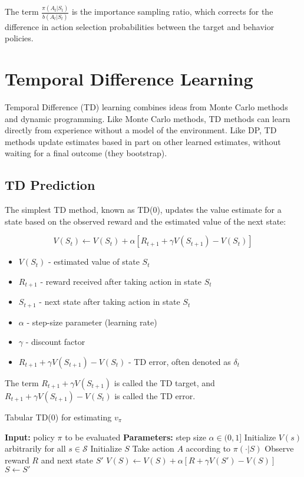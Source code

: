 \documentclass[11pt,a4paper]{article}
\begin{document}
The term $\frac{\pi(A_t|S_t)}{b(A_t|S_t)}$ is the importance sampling ratio, which corrects for the difference in action selection probabilities between the target and behavior policies.

\section{Temporal Difference Learning}

Temporal Difference (TD) learning combines ideas from Monte Carlo methods and dynamic programming. Like Monte Carlo methods, TD methods can learn directly from experience without a model of the environment. Like DP, TD methods update estimates based in part on other learned estimates, without waiting for a final outcome (they bootstrap).

\subsection{TD Prediction}

The simplest TD method, known as TD(0), updates the value estimate for a state based on the observed reward and the estimated value of the next state:

\begin{equation}
V(S_t) \leftarrow V(S_t) + \alpha [R_{t+1} + \gamma V(S_{t+1}) - V(S_t)]
\end{equation}

\begin{tcolorbox}[title=Notation Overview]
\begin{itemize}
    \item $V(S_t)$ - estimated value of state $S_t$
    \item $R_{t+1}$ - reward received after taking action in state $S_t$
    \item $S_{t+1}$ - next state after taking action in state $S_t$
    \item $\alpha$ - step-size parameter (learning rate)
    \item $\gamma$ - discount factor
    \item $R_{t+1} + \gamma V(S_{t+1}) - V(S_t)$ - TD error, often denoted as $\delta_t$
\end{itemize}
\end{tcolorbox}

The term $R_{t+1} + \gamma V(S_{t+1})$ is called the TD target, and $R_{t+1} + \gamma V(S_{t+1}) - V(S_t)$ is called the TD error.

\begin{algorithm}[H]
\caption{Tabular TD(0) for estimating $v_\pi$}
\begin{algorithmic}[1]
\State \textbf{Input:} policy $\pi$ to be evaluated
\State \textbf{Parameters:} step size $\alpha \in (0, 1]$
\State Initialize $V(s)$ arbitrarily for all $s \in \mathcal{S}$
    \State Initialize $S$
        \State Take action $A$ according to $\pi(·|S)$
        \State Observe reward $R$ and next state $S'$
        \State $V(S) \leftarrow V(S) + \alpha [R + \gamma V(S') - V(S)]$
        \State $S \leftarrow S'$
    \EndFor
\EndFor
\end{algorithmic}
\end{algorithm}
\end{document}
